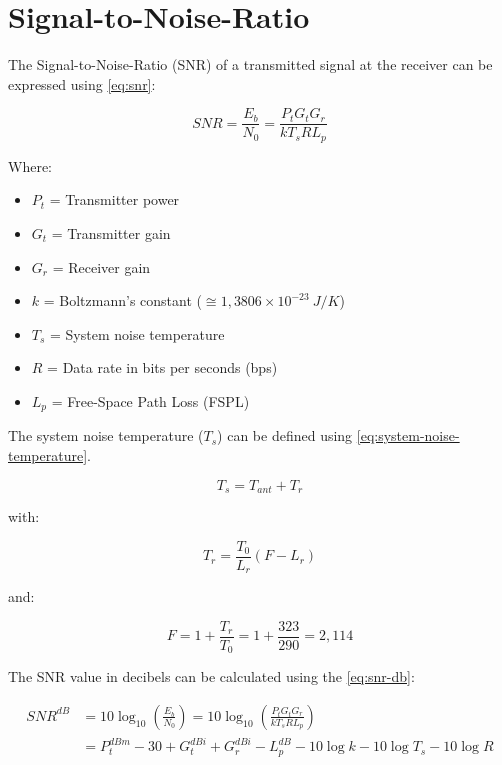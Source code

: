 \section{Signal-to-Noise-Ratio}

The Signal-to-Noise-Ratio (SNR) of a transmitted signal at the receiver can be expressed using \autoref{eq:snr}:

\begin{equation} \label{eq:snr}
SNR = \frac{E_{b}}{N_{0}} = \frac{P_{t}G_{t}G_{r}}{kT_{s}RL_{p}}
\end{equation}

Where:

\begin{itemize}
    \item $P_{t}$ = Transmitter power
    \item $G_{t}$ = Transmitter gain
    \item $G_{r}$ = Receiver gain
    \item $k$ = Boltzmann's constant ($\cong 1,3806 \times 10^{-23}\ J/K$)
    \item $T_{s}$ = System noise temperature
    \item $R$ = Data rate in bits per seconds (bps)
    \item $L_{p}$ = Free-Space Path Loss (FSPL)
\end{itemize}

The system noise temperature ($T_{s}$) can be defined using \autoref{eq:system-noise-temperature}.

\begin{equation} \label{eq:system-noise-temperature}
    T_{s} = T_{ant} + T_{r}
\end{equation}

with:

\begin{equation}
    T_{r} = \frac{T_{0}}{L_{r}} (F - L_{r})
\end{equation}

and:

\begin{equation}
    F = 1 + \frac{T_{r}}{T_{0}} = 1 + \frac{323}{290} = 2,114
\end{equation}

The SNR value in decibels can be calculated using the \autoref{eq:snr-db}:

\begin{equation} \label{eq:snr-db}
    \begin{split}
        SNR^{dB} & = 10\log_{10}\left( \frac{E_{b}}{N_{0}} \right) = 10\log_{10} \left( \frac{P_{t}G_{t}G_{r}}{kT_{s}RL_{p}} \right) \\
                 & = P_{t}^{dBm} - 30 + G_{t}^{dBi} + G_{r}^{dBi} - L_{p}^{dB} - 10\log k - 10\log T_{s} - 10\log R
    \end{split}
\end{equation}

